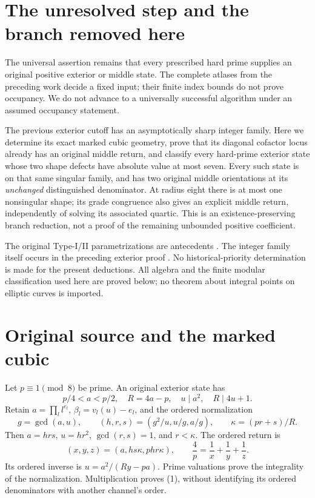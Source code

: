 \section{The unresolved step and the branch removed here}
The universal assertion remains that every prescribed hard prime supplies an
original positive exterior or middle state. The complete atlases from the
preceding work decide a fixed input; their finite index bounds do not prove
occupancy. We do not advance to a universally successful algorithm under an
assumed occupancy statement.

The previous exterior cutoff has an asymptotically sharp integer family. Here
we determine its exact marked cubic geometry, prove that its diagonal cofactor
locus already has an original middle return, and classify every hard-prime
exterior state whose two shape defects have absolute value at most seven.
Every such state is on that same singular family, and has two original middle
orientations at its \emph{unchanged} distinguished denominator. At radius eight
there is at most one nonsingular shape; its grade congruence also gives an explicit
middle return, independently of solving its associated quartic.
This is an existence-preserving branch reduction, not a proof of the remaining
unbounded positive coefficient.

The original Type-I/II parametrizations are antecedents \cite[\S2]{ET}.
The integer family itself occurs in the preceding exterior proof
\cite[\S5]{Exterior}. No historical-priority determination is made for the
present deductions. All algebra and the finite modular classification used here
are proved below; no theorem about integral points on elliptic curves is imported.

\section{Original source and the marked cubic}
Let $p\equiv1\pmod8$ be prime. An original exterior state has
\[
 p/4<a<p/2,\quad R=4a-p,\quad u\mid a^2,\quad R\mid4u+1.
\]
Retain $a=\prod_l l^{e_l}$, $\beta_l=v_l(u)-e_l$, and the ordered normalization
\[
 g=\gcd(a,u),\qquad
 (h,r,s)=(g^2/u,u/g,a/g),\qquad \kappa=(pr+s)/R.
\]
Then $a=hrs$, $u=hr^2$, $\gcd(r,s)=1$, and $r<\kappa$. The ordered return is
\[
 (x,y,z)=(a,hs\kappa,phr\kappa),\qquad
 \frac4p=\frac1x+\frac1y+\frac1z.                         \tag{1}
\]
Its ordered inverse is $u=a^2/(Ry-pa)$. Prime valuations prove the integrality
of the normalization. Multiplication proves (1), without identifying its
ordered denominators with another channel's order.

